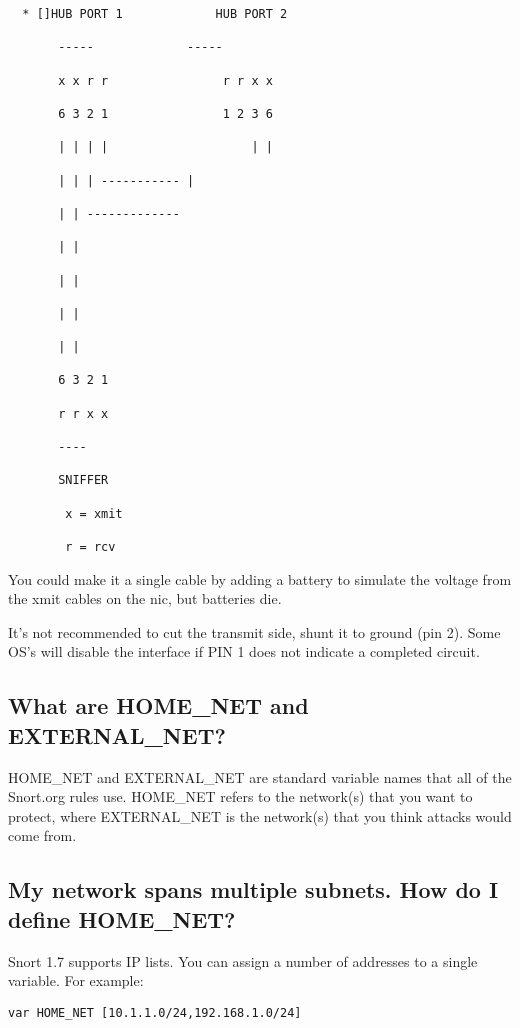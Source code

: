 \documentclass{article}
\begin{document}
\begin{verbatim}
  * []HUB PORT 1             HUB PORT 2

       -----             -----

       x x r r                r r x x

       6 3 2 1                1 2 3 6

       | | | |                    | |

       | | | ----------- |

       | | -------------

       | |

       | |

       | |

       | |

       6 3 2 1

       r r x x

       ----

       SNIFFER

        x = xmit

        r = rcv
\end{verbatim}
You could make it a single cable by adding a battery to simulate the voltage
from the xmit cables on the nic, but batteries die.

It's not recommended to cut the transmit side, shunt it to ground (pin 2). Some
OS's will disable the interface if PIN 1 does not indicate a completed circuit.

\subsection{What are HOME\_NET and EXTERNAL\_NET?}

HOME\_NET and EXTERNAL\_NET are standard variable names that all of the Snort.org
rules use. HOME\_NET refers to the network(s) that you want to protect, where
EXTERNAL\_NET is the network(s) that you think attacks would come from.

\subsection{My network spans multiple subnets.  How do I define HOME\_NET?}

Snort 1.7 supports IP lists.  You can assign a number of addresses to
a single variable.  For example:

\begin{verbatim}var HOME_NET [10.1.1.0/24,192.168.1.0/24]\end{verbatim}
\end{document}
